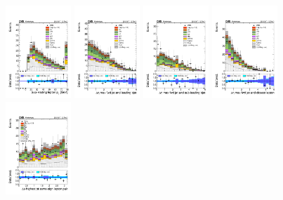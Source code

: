 \begin{figure} [!h]
  \centering
  \includegraphics[width=0.22\textwidth]{figures/signalregion_2lss/ee/Lep2Pt.pdf}
  \includegraphics[width=0.22\textwidth]{figures/signalregion_2lss/ee/dEtaFwdJetBJet_40.pdf}
  \includegraphics[width=0.22\textwidth]{figures/signalregion_2lss/ee/dEtaFwdJet2BJet_40.pdf}
  \includegraphics[width=0.22\textwidth]{figures/signalregion_2lss/ee/dEtaFwdJetClosestLep_40.pdf} \\
  \includegraphics[width=0.22\textwidth]{figures/signalregion_2lss/ee/dPhiHighestPtSSPair.pdf}

\end{figure}

